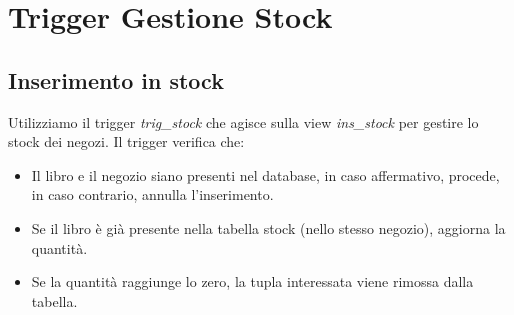 \section{Trigger Gestione Stock}

\subsection{Inserimento in stock}
Utilizziamo il trigger \textit{trig\_stock} che agisce sulla view \textit{ins\_stock} per gestire lo stock dei negozi. 
Il trigger verifica che:
\begin{itemize}
    \item Il libro e il negozio siano presenti nel database, in caso affermativo, procede, in caso contrario, annulla l'inserimento.
    \item Se il libro \`e gi\`a presente nella tabella stock (nello stesso negozio), aggiorna la quantit\`a.
    \item Se la quantit\`a raggiunge lo zero, la tupla interessata viene rimossa dalla tabella.
\end{itemize}

